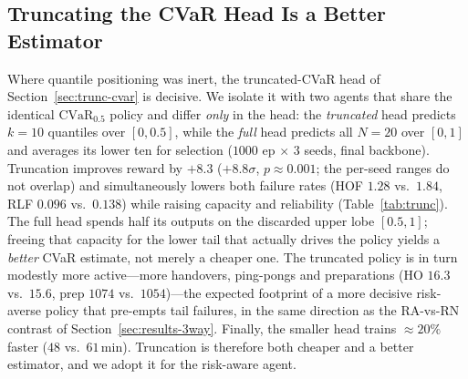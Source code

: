\documentclass[conference]{IEEEtran}
\begin{document}
\subsection{Truncating the CVaR Head Is a Better Estimator}
\label{sec:results-trunc}
Where quantile positioning was inert, the truncated-CVaR head of
Section~\ref{sec:trunc-cvar} is decisive. We isolate it with two agents that
share the identical $\mathrm{CVaR}_{0.5}$ policy and differ \emph{only} in the
head: the \emph{truncated} head predicts $k=10$ quantiles over $[0,0.5]$, while
the \emph{full} head predicts all $N=20$ over $[0,1]$ and averages its lower ten
for selection ($1000$ ep $\times$ $3$ seeds, final backbone). Truncation
improves reward by $+8.3$ ($+8.8\sigma$, $p\approx0.001$; the per-seed ranges do
not overlap) and simultaneously lowers both failure rates (HOF $1.28$ vs.\
$1.84$, RLF $0.096$ vs.\ $0.138$) while raising capacity and reliability
(Table~\ref{tab:trunc}). The full head spends half its outputs on the
discarded upper lobe $[0.5,1]$; freeing that capacity for the lower tail that
actually drives the policy yields a \emph{better} CVaR estimate, not merely a
cheaper one. The truncated policy is in turn modestly more active---more handovers,
ping-pongs and preparations (HO $16.3$ vs.\ $15.6$, prep $1074$ vs.\ $1054$)---the
expected footprint of a more decisive risk-averse policy that pre-empts tail
failures, in the same direction as the RA-vs-RN contrast of
Section~\ref{sec:results-3way}. Finally, the smaller head trains ${\approx}20\%$
faster ($48$ vs.\ $61$\,min). Truncation is therefore both cheaper and a better
estimator, and we adopt it for the risk-aware agent.
\end{document}
